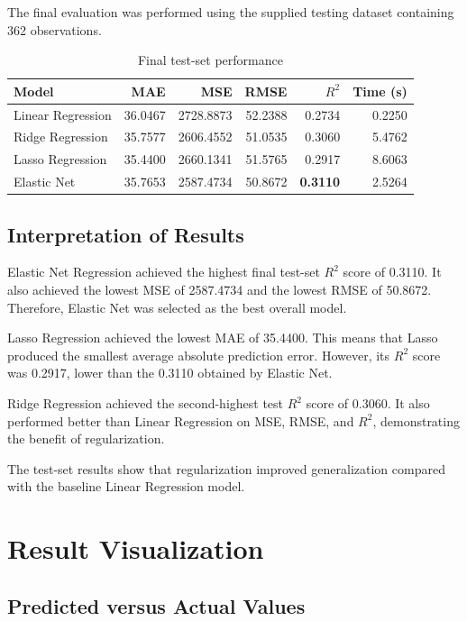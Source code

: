 \documentclass[12pt,a4paper]{article}
\begin{document}
The final evaluation was performed using the supplied testing dataset containing 362 observations.

\begin{table}[H]
\centering
\caption{Final test-set performance}
\begin{tabular}{lrrrrr}
\toprule
\textbf{Model} & \textbf{MAE} & \textbf{MSE} & \textbf{RMSE} & \textbf{$R^2$} & \textbf{Time (s)} \\
\midrule
Linear Regression & 36.0467 & 2728.8873 & 52.2388 & 0.2734 & 0.2250 \\
Ridge Regression & 35.7577 & 2606.4552 & 51.0535 & 0.3060 & 5.4762 \\
Lasso Regression & 35.4400 & 2660.1341 & 51.5765 & 0.2917 & 8.6063 \\
Elastic Net & 35.7653 & 2587.4734 & 50.8672 & \textbf{0.3110} & 2.5264 \\
\bottomrule
\end{tabular}
\end{table}

\subsection{Interpretation of Results}

Elastic Net Regression achieved the highest final test-set $R^2$ score of 0.3110. It also achieved the lowest MSE of 2587.4734 and the lowest RMSE of 50.8672. Therefore, Elastic Net was selected as the best overall model.

Lasso Regression achieved the lowest MAE of 35.4400. This means that Lasso produced the smallest average absolute prediction error. However, its $R^2$ score was 0.2917, lower than the 0.3110 obtained by Elastic Net.

Ridge Regression achieved the second-highest test $R^2$ score of 0.3060. It also performed better than Linear Regression on MSE, RMSE, and $R^2$, demonstrating the benefit of regularization.

The test-set results show that regularization improved generalization compared with the baseline Linear Regression model.

\section{Result Visualization}

\subsection{Predicted versus Actual Values}
\end{document}
